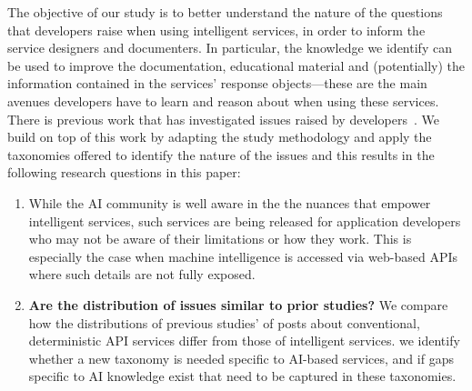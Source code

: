 The objective of our study is to better understand the nature of the questions
that developers raise when using intelligent services, in order to inform the service designers and documenters. In particular, the knowledge we identify can be used to improve the documentation, educational material and (potentially) the information contained in the services' response objects---these are the main avenues developers have to learn and reason about when using these services. There is previous work that has investigated issues raised by developers~\citep{Tahir:2018ks, Beyer:2018fm, Aghajani:2019bo}. We build on top of this work by adapting the study methodology and apply the taxonomies offered to identify the nature of the issues and this results in the following research questions in this paper:

\begin{enumerate}[label=\textbf{RQ\arabic*.},leftmargin=0.1125\linewidth]
  \item \textbf{} While the AI community is well aware in the the nuances that empower intelligent services, such services are being released for application developers who may not be aware of their limitations or how they work. This is especially the case when machine intelligence is accessed via web-based APIs where such details are not fully exposed. 
  \item \textbf{Are the distribution of issues similar to prior studies?}  
  We compare how the distributions of previous studies' of posts about conventional, deterministic API services differ from those of intelligent services.  we identify whether a new taxonomy is needed specific to AI-based services, and if gaps specific to AI knowledge exist that need to be captured in these taxonomies.
\end{enumerate}



